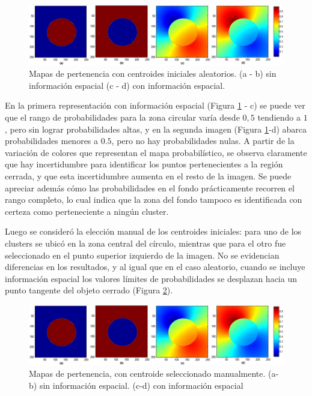 \begin{figure}[H]
\centering
\includegraphics[scale=0.08]{images/circulo-001.jpg}
\caption{Mapas de pertenencia con centroides iniciales aleatorios. (a - b)  sin información espacial (c - d) con información espacial.}
\label{fig:circulo_aleatorio}
\end{figure}

En la primera representación con información espacial (Figura \ref{fig:circulo_aleatorio} - c) se puede ver que el rango de probabilidades para la zona circular varía desde $0,5$ tendiendo a $1$, pero sin lograr probabilidades altas, y en la segunda imagen (Figura \ref{fig:circulo_aleatorio}-d) abarca probabilidades menores a $0.5$, pero no hay probabilidades nulas. A partir de la variación de colores que representan el mapa probabilístico, se observa claramente que hay incertidumbre para identificar los puntos pertenecientes a la región cerrada, y que esta incertidumbre aumenta en el resto de la imagen. Se puede apreciar además cómo las probabilidades en el fondo prácticamente recorren el rango completo, lo cual indica que la zona del fondo tampoco  es identificada con certeza como perteneciente a ningún cluster.

Luego se consideró la elección manual de los centroides iniciales: para uno de los clusters se ubicó en la zona central del círculo, mientras que para el otro fue seleccionado en el punto superior izquierdo de la imagen. No se evidencian diferencias en los resultados, y al igual que en el caso aleatorio, cuando se incluye información espacial los valores límites de probabilidades se desplazan hacia un punto tangente del objeto cerrado (Figura \ref{fig:circulo_aleatorio_centr_manual}).

\begin{figure}[H]
\centering
\includegraphics[scale=0.08]{images/circulo-001.jpg}
\caption{Mapas de pertenencia, con centroide seleccionado manualmente. (a-b) sin información espacial. (c-d) con información espacial}
\label{fig:circulo_aleatorio_centr_manual}
\end{figure}

